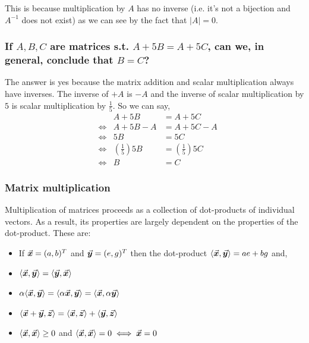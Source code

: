 \documentclass[MathsNotesBase.tex]{subfiles}
\begin{document}
{		This is because multiplication by $A$ has no inverse (i.e. it's not a bijection and $A^{-1}$ does not exist) as we can see by the fact that $\vert{A}\vert = 0$.
		
		\subsubsection{\small{If $A,B,C$ are matrices s.t. $A + 5B = A + 5C$, can we, in general, conclude that $B = C$?}}
		The answer is yes because the matrix addition and scalar multiplication always have inverses. The inverse of $+ A$ is $- A$ and the inverse of scalar multiplication by $5$ is scalar multiplication by $\frac{1}{5}$. So we can say,
		\begin{align*}
		&& A + 5B &= A + 5C\\[8pt]
		&\iff & A + 5B - A &= A + 5C - A\\[8pt]
		&\iff & 5B &= 5C\\[8pt]
		&\iff & \left(\frac{1}{5}\right)5B &= \left(\frac{1}{5}\right)5C\\[8pt]
		&\iff & B &= C
		\end{align*}
		
		
		
		\subsubsection*{Matrix multiplication}
		Multiplication of matrices proceeds as a collection of dot-products of individual vectors. As a result, its properties are largely dependent on the properties of the dot-product. These are:
		\newcommand\vx{\V{x}}
		\newcommand\vy{\V{y}}
		\newcommand\vz{\V{z}}
		\begin{itemize}
		\item[]{If $\vec{\bm{x}} = (a, b)^{T}$ and $\vec{\bm{y}} = (e, g)^{T}$ then the dot-product $\langle \vec{\bm{x}}, \vec{\bm{y}} \rangle = ae + bg$ and,}
		\item{$\langle \vx, \vy \rangle = \langle \vy, \vx \rangle$}
		\item{$\alpha\langle \vx, \vy \rangle = \langle \alpha \vx, \vy \rangle = \langle \vx, \alpha \vy \rangle$}
		\item{$\langle \vx+\vy, \vz \rangle = \langle \vx, \vz \rangle + \langle \vy, \vz \rangle$}
		\item{$\langle \vx, \vx \rangle \geq 0$ and $\langle \vx, \vx \rangle = 0 \iff \vx = 0$}
		\end{itemize}
		
}
\end{document}
